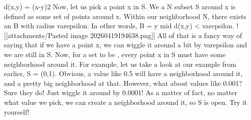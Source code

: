 \markdownRendererDollarSign{}d(x,y) = (x-y)\markdownRendererCircumflex{}2\markdownRendererDollarSign{}\markdownRendererOlItemEnd 
\markdownRendererOlEndTight \markdownRendererBlockQuoteEnd \markdownRendererInterblockSeparator
{}Now, let us pick a point \markdownRendererDollarSign{}x \markdownRendererBackslash{}in S\markdownRendererDollarSign{}. We a  \markdownRendererDollarSign{}N \markdownRendererBackslash{}subset S\markdownRendererDollarSign{} around \markdownRendererDollarSign{}x\markdownRendererDollarSign{} is defined as some set of points around \markdownRendererDollarSign{}x\markdownRendererDollarSign{}. Within our neighborhood \markdownRendererDollarSign{}N\markdownRendererDollarSign{}, there exists an  \markdownRendererDollarSign{}B\markdownRendererDollarSign{} with radius \markdownRendererDollarSign{}\markdownRendererBackslash{}varepsilon\markdownRendererDollarSign{}. In other words, \markdownRendererDollarSign{}B = \markdownRendererLeftBrace{}y \markdownRendererBackslash{}mid d(x,y) < \markdownRendererBackslash{}varepsilon\markdownRendererRightBrace{}\markdownRendererDollarSign{}.\markdownRendererSoftLineBreak
{}![[attachments/Pasted image 20260419194638.png]]\markdownRendererParagraphSeparator
{}All of that is a fancy way of saying that if we have a point \markdownRendererDollarSign{}x\markdownRendererDollarSign{}, we can wiggle it around a bit by \markdownRendererDollarSign{}\markdownRendererBackslash{}varepsilon\markdownRendererDollarSign{} and we are still in \markdownRendererDollarSign{}S\markdownRendererDollarSign{}.\markdownRendererParagraphSeparator
{}Now, for a set to be , every point \markdownRendererDollarSign{}x \markdownRendererBackslash{}in S\markdownRendererDollarSign{} must have some neighborhood around it. For example, let us take a look at our example from earlier, \markdownRendererDollarSign{}S = (0,1)\markdownRendererDollarSign{}.\markdownRendererParagraphSeparator
{}Obvious, a value like \markdownRendererDollarSign{}0.5\markdownRendererDollarSign{} will have a neighborhood around it, and a pretty big neighborhood at that. However, what about values like \markdownRendererDollarSign{}0.001\markdownRendererDollarSign{}? Sure they do! Just wiggle it around by \markdownRendererDollarSign{}0.0001\markdownRendererDollarSign{}! As a matter of fact, no matter what value we pick, we can  create a neighborhood around it, so \markdownRendererDollarSign{}S\markdownRendererDollarSign{} is open. Try it yourself!\markdownRendererSoftLineBreak
